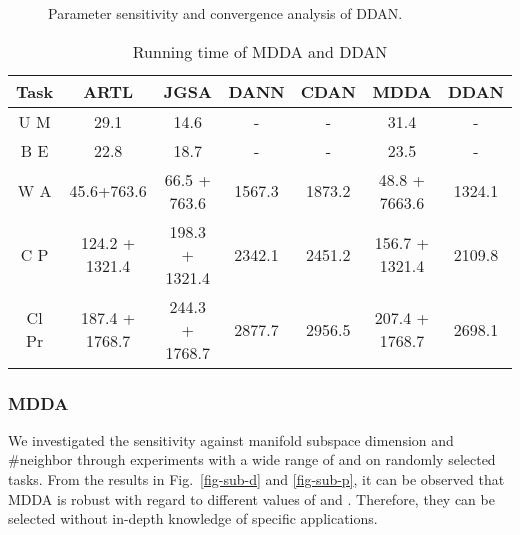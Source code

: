 \documentclass[acmsmall]{acmart}
\begin{document}
\begin{figure*}[t!]
	\centering


	\hspace{-.1in}
	\hspace{-.2in}
	\hspace{-.1in}
	\vspace{-.2in}
	\caption{Parameter sensitivity and convergence analysis of DDAN.}
	\label{fig-ddan-para}

\end{figure*}

\begin{table}[t!]
\caption{Running time of MDDA and DDAN}
\vspace{-.1in}
\label{tb-time}
\begin{tabular}{|c|c|c|c|c|c|c|}
\hline
Task & ARTL & JGSA & DANN & CDAN & MDDA & DDAN \\ \hline \hline
U  M & 29.1 & 14.6 & - & - & 31.4 & - \\ \hline
B  E & 22.8 & 18.7 & - & - & 23.5 & - \\ \hline
W  A & 45.6+763.6 & 66.5 + 763.6 & 1567.3 & 1873.2 & 48.8 + 7663.6 & 1324.1 \\ \hline
C  P & 124.2 + 1321.4 & 198.3 + 1321.4 & 2342.1 & 2451.2 & 156.7 + 1321.4 & 2109.8 \\ \hline
Cl  Pr & 187.4 + 1768.7 & 244.3 + 1768.7 & 2877.7 & 2956.5 & 207.4 + 1768.7 & 2698.1 \\ \hline
\end{tabular}
\end{table}

\subsubsection{MDDA}

We investigated the sensitivity against manifold subspace dimension  and \#neighbor  through experiments with a wide range of  and  on randomly selected tasks. From the results in Fig.~\ref{fig-sub-d} and \ref{fig-sub-p}, it can be observed that MDDA is robust with regard to different values of  and . Therefore, they can be selected without in-depth knowledge of specific applications. 
\end{document}
